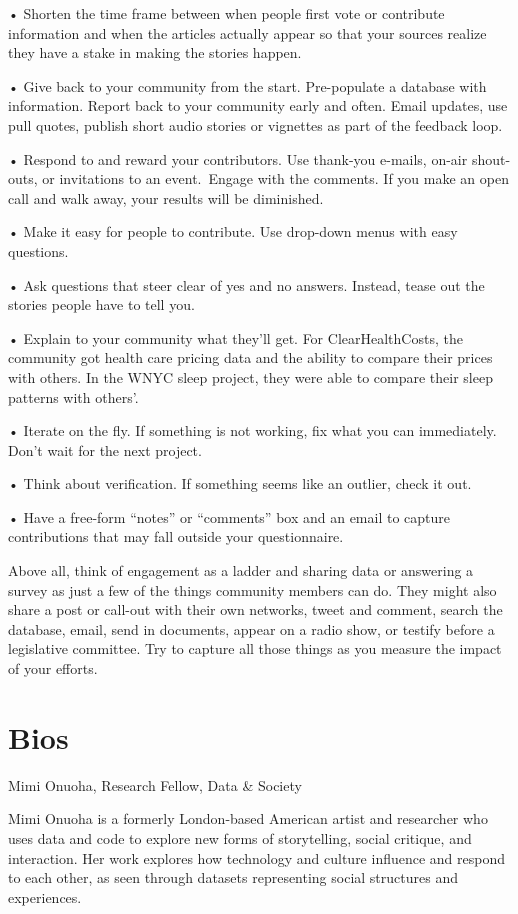 \begin{itemize}
\begin{itemize}
\begin{enumerate}
{• Shorten the time frame between when people first vote or contribute information and when the articles actually appear so that your sources realize they have a stake in making the stories happen.  

• Give back to your community from the start. Pre-populate a database with information. Report back to your community early and often. Email updates, use pull quotes, publish short audio stories or vignettes as part of the feedback loop. 

• Respond to and reward your contributors. Use thank-you e-mails, on-air shout-outs, or invitations to an event. Engage with the comments. If you make an open call and walk away, your results will be diminished. 

• Make it easy for people to contribute. Use drop-down menus with easy questions. 

• Ask questions that steer clear of yes and no answers. Instead, tease out the stories people have to tell you. 

• Explain to your community what they’ll get. For ClearHealthCosts, the community got health care pricing data and the ability to compare their prices with others. In the WNYC sleep project, they were able to compare their sleep patterns with others’. 

• Iterate on the fly. If something is not working, fix what you can immediately. Don’t wait for the next project. 

• Think about verification. If something seems like an outlier, check it out. 

• Have a free-form “notes” or “comments” box and an email to capture contributions that may fall outside your questionnaire.

Above all, think of engagement as a ladder and sharing data or answering a survey as just a few of the things community members can do. They might also share a post or call-out with their own networks, tweet and comment, search the database, email, send in documents, appear on a radio show, or testify before a legislative committee. Try to capture all those things as you measure the impact of your efforts.


\chapter{Bios}

Mimi Onuoha, Research Fellow, Data & Society 

Mimi Onuoha is a formerly London-based American artist and researcher who uses data and code to explore new forms of storytelling, social critique, and interaction. Her work explores how technology and culture influence and respond to each other, as seen through datasets representing social structures and experiences.

}
\end{enumerate}
\end{itemize}
\end{itemize}
